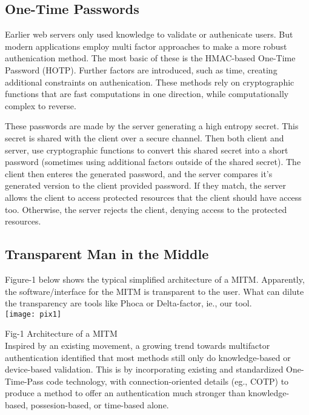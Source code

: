 \documentclass[a4paper, 11pt]{article} 				%
\begin{document}
\subsection{One-Time Passwords}
Earlier web servers only used knowledge to validate or authenicate users. But modern applications employ multi factor approaches to make a more robust authenication method. The most basic of these is the HMAC-based One-Time Password (HOTP). Further factors are introduced, such as time, creating additional constraints on authenication. These methods rely on cryptographic functions that are fast computations in one direction, while computationally complex to reverse.

These passwords are made by the server generating a high entropy secret. This secret is shared with the client over a secure channel. Then both client and server, use cryptographic functions to convert this shared secret into a short password (sometimes using additional factors outside of the shared secret). The client then enteres the generated password, and the server compares it's generated version to the client provided password. If they match, the server allows the client to access protected resources that the client should have access too. Otherwise, the server rejects the client, denying access to the protected resources.

\subsection{Transparent Man in the Middle}
Figure-1 below shows the typical simplified architecture of a MITM. 
Apparently, the software/interface for the MITM is transparent to the user. What can dilute the transparency are tools like Phoca or Delta-factor, ie., our tool.\\

\texttt{[image: pix1]}
  
Fig-1 Architecture of a MITM\\ 

Inspired by an existing movement, a growing trend towards multifactor authentication
identified that most methods still only do knowledge-based or device-based validation. This is by incorporating existing and standardized One-Time-Pass code technology, with connection-oriented details (eg., COTP) to produce a method to offer an authentication much stronger than knowledge-based, possesion-based, or time-based alone. 
\end{document}
